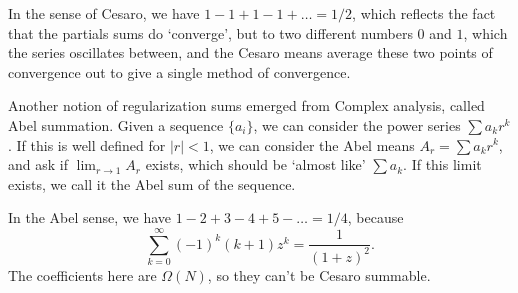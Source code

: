 \begin{example}
In the sense of Cesaro, we have $1 - 1 + 1 - 1 + \dots = 1/2$, which reflects the fact that the partials sums do `converge', but to two different numbers $0$ and $1$, which the series oscillates between, and the Cesaro means average these two points of convergence out to give a single method of convergence.
\end{example}

Another notion of regularization sums emerged from Complex analysis, called Abel summation. Given a sequence $\{ a_i \}$, we can consider the power series $\sum a_k r^k$. If this is well defined for $|r| < 1$, we can consider the Abel means $A_r = \sum a_k r^k$, and ask if $\lim_{r \to 1} A_r$ exists, which should be `almost like' $\sum a_k$. If this limit exists, we call it the Abel sum of the sequence.

\begin{example}
    In the Abel sense, we have $1 - 2 + 3 - 4 + 5 - \dots = 1/4$, because
    \[ \sum_{k = 0}^\infty (-1)^k (k + 1) z^k = \frac{1}{(1 + z)^2}. \]
    The coefficients here are $\Omega(N)$, so they can't be Cesaro summable.
\end{example}



